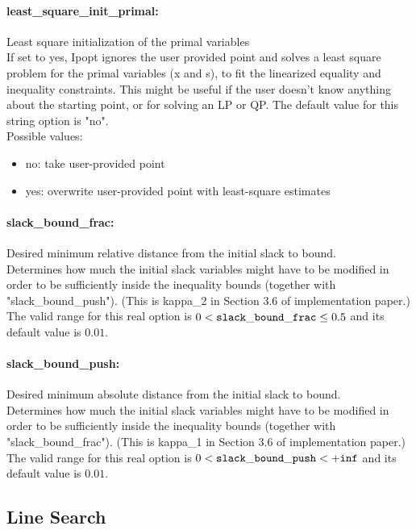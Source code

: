 \paragraph{least\_square\_init\_primal:}\label{sec:least_square_init_primal} Least square initialization of the primal variables $\;$ \\
 If set to yes, Ipopt ignores the user provided
point and solves a least square problem for the
primal variables (x and s), to fit the linearized
equality and inequality constraints.  This might
be useful if the user doesn't know anything about
the starting point, or for solving an LP or QP.
The default value for this string option is "no".
\\ 
Possible values:
\begin{itemize}
   \item no: take user-provided point
   \item yes: overwrite user-provided point with least-square
estimates
\end{itemize}

\paragraph{slack\_bound\_frac:}\label{sec:slack_bound_frac} Desired minimum relative distance from the initial slack to bound. $\;$ \\
 Determines how much the initial slack variables
might have to be modified in order to be
sufficiently inside the inequality bounds
(together with "slack\_bound\_push").  (This is
kappa\_2 in Section 3.6 of implementation paper.) The valid range for this real option is 
$0 <  {\tt slack\_bound\_frac } \le 0.5$
and its default value is $0.01$.


\paragraph{slack\_bound\_push:}\label{sec:slack_bound_push} Desired minimum absolute distance from the initial slack to bound. $\;$ \\
 Determines how much the initial slack variables
might have to be modified in order to be
sufficiently inside the inequality bounds
(together with "slack\_bound\_frac").  (This is
kappa\_1 in Section 3.6 of implementation paper.) The valid range for this real option is 
$0 <  {\tt slack\_bound\_push } <  {\tt +inf}$
and its default value is $0.01$.


\subsection{Line Search}
\label{sec:Line_Search}
